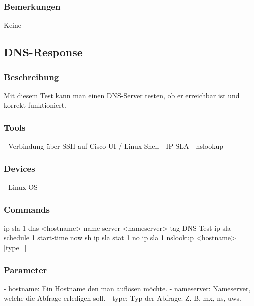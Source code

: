 \documentclass[a4,12pt]{scrartcl}
\begin{document}
\subsubsection{Bemerkungen}
Keine

\subsection{DNS-Response}
\subsubsection{Beschreibung}
Mit diesem Test kann man einen DNS-Server testen, ob er erreichbar ist und korrekt funktioniert.
\subsubsection{Tools}
- Verbindung über SSH auf Cisco UI / Linux Shell\newline
- IP SLA\newline
- nslookup\newline
\subsubsection{Devices}
- Linux OS
\subsubsection{Commands}
\newline
ip sla 1\newline
dns <hostname> name-server <nameserver>\newline
tag DNS-Test\newline
ip sla schedule 1 start-time now\newline
sh ip sla stat 1\newline
no ip sla 1\newline
{}
nslookup <hostname> [type=]
\subsubsection{Parameter}
- hostname: Ein Hostname den man auflösen möchte.\newline
- nameserver: Nameserver, welche die Abfrage erledigen soll.\newline
- type: Typ der Abfrage. Z. B. mx, ns, uws.\newline
\end{document}
